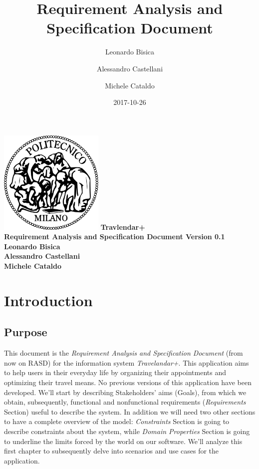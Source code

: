 \documentclass[12pt, a4paper]{article}
\title{Requirement Analysis and Specification Document}
\date{2017-10-26}
\author{
	Leonardo Bisica
	\and
	Alessandro Castellani
	\and
	Michele Cataldo
}
\begin{document}
	\begin{titlepage}
		\centering
		\includegraphics[width=5cm]{img/polimi_logo.png} %
		\vfill
		{\bfseries\Large
			Travlendar+\\
			Requirement Analysis and Specification Document
			Version 0.1\\
			\vskip4cm
			Leonardo Bisica\\
			Alessandro Castellani\\
			Michele Cataldo\\
		}
		\vfill
		\vfill
	\end{titlepage}

	\tableofcontents
	
	\newpage
	\section{Introduction}
		\subsection{Purpose}
		
		This document is the \textit{Requirement Analysis and Specification Document} (from now on RASD) for the information system \textit{Travelandar+}.
		This application aims to help users in their everyday life by organizing their appointments and optimizing their travel means.
		No previous versions of this application have been developed. 
		We’ll start by describing Stakeholders’ aims (Goals), from which we obtain, subsequently, functional and nonfunctional requirements (\textit{Requirements} Section) useful to describe the system.
		In addition we will need two other sections to have a complete overview of the model: \textit{Constraints} Section is going to describe constraints about the system, while \textit{Domain Properties} Section is going to underline the limits forced by the world on our software.
		We'll analyze this first chapter to subsequently delve into scenarios and use cases for the application.
		
\end{document}
